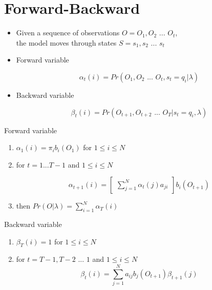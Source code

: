 \section{Forward-Backward}
\begin{frame}
\begin{itemize}
	\item Given a sequence of observations $O = O_1, O_2 \text{ ... } O_t$, \\
	      the model moves through states $S = s_1, s_2 \text{ ... } s_t$ \\ 
	\item Forward variable

		$$\alpha_t(i) = Pr(O_1, O_2 \text{ ... } O_t, s_t = q_i \vert \lambda)$$

	\item Backward variable

		$$\beta_t(i) = Pr(O_{t+1}, O_{t+2} \text{ ... } O_T \vert s_t = q_i, \lambda)$$ 
\end{itemize}
\end{frame}

\begin{frame}
Forward variable
\begin{center}
	\begin{enumerate}
		\item $\alpha_1(i) = \pi_ib_i(O_1)$ for $1 \leq i \leq N$
		\item for $t = 1 ... T-1$ and $1 \leq i \leq N$

			$$\alpha_{t+1}(i) = \begin{bmatrix} \sum_{j=1}^N\alpha_t(j)a_{ji} \end{bmatrix} b_i(O_{t+1})$$

		\item then $Pr(O | \lambda) = \sum_{i=1}^N\alpha_T(i)$
	\end{enumerate}
\end{center}
\end{frame}

\begin{frame}
Backward variable
\begin{center}
	\begin{enumerate}
		\item $\beta_T(i) = 1$ for $1 \leq i \leq N$ \\
		\item for $t = T-1, T-2 \text{ ... } 1$ and $1 \leq i \leq N$
			$$\beta_t(i) = \sum_{j=1}^N a_{ij}b_j(O_{t+1})\beta_{t+1}(j)$$

	\end{enumerate}
\end{center}
\end{frame}

















